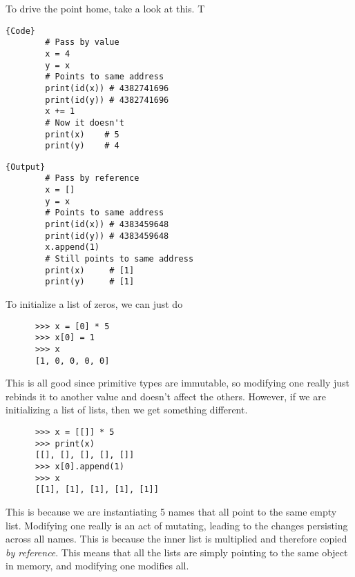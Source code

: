  \begin{example}
    To drive the point home, take a look at this. T

    \noindent\begin{minipage}{.5\textwidth}
      \begin{lstlisting}[]{Code}
        # Pass by value
        x = 4 
        y = x
        # Points to same address
        print(id(x)) # 4382741696 
        print(id(y)) # 4382741696 
        x += 1 
        # Now it doesn't
        print(x)    # 5
        print(y)    # 4
      \end{lstlisting}
      \end{minipage}
      \hfill
      \begin{minipage}{.49\textwidth}
      \begin{lstlisting}[]{Output}
        # Pass by reference
        x = [] 
        y = x
        # Points to same address 
        print(id(x)) # 4383459648
        print(id(y)) # 4383459648
        x.append(1) 
        # Still points to same address
        print(x)     # [1]
        print(y)     # [1]
      \end{lstlisting}
    \end{minipage}
  \end{example}

  \begin{example}
    To initialize a list of zeros, we can just do 
    \begin{lstlisting}
      >>> x = [0] * 5
      >>> x[0] = 1
      >>> x
      [1, 0, 0, 0, 0] 
    \end{lstlisting}
    This is all good since primitive types are immutable, so modifying one really just rebinds it to another value and doesn't affect the others. However, if we are initializing a list of lists, then we get something different. 
    \begin{lstlisting}
      >>> x = [[]] * 5
      >>> print(x)
      [[], [], [], [], []]
      >>> x[0].append(1)
      >>> x
      [[1], [1], [1], [1], [1]] 
    \end{lstlisting}
    This is because we are instantiating 5 names that all point to the same empty list. Modifying one really is an act of mutating, leading to the changes persisting across all names. This is because the inner list is multiplied and therefore copied \textit{by reference}. This means that all the lists are simply pointing to the same object in memory, and modifying one modifies all.  
  \end{example}

